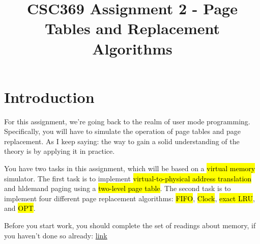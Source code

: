\documentclass[12pt]{article}
\begin{document}
\title{CSC369 Assignment 2 - Page Tables and Replacement Algorithms}
\maketitle

\bigskip

\section{Introduction}

\bigskip

For this assignment, we're going back to the realm of user mode programming.
Specifically, you will have to simulate the operation of page tables and page
replacement. As I keep saying: the way to gain a solid understanding of the theory
is by applying it in practice.

\bigskip

\noindent You have two tasks in this assignment, which will be based on a \hl{virtual memory}
simulator. The first task is to implement \hl{virtual-to-physical address translation}
and hl{demand paging} using a \hl{two-level page table}. The second task is to implement
four different page replacement algorithms: \hl{FIFO}, \hl{Clock}, \hl{exact LRU}, and \hl{OPT}.

\bigskip

\noindent Before you start work, you should complete the set of readings about memory, if
you haven't done so already: \href{http://pages.cs.wisc.edu/~remzi/OSTEP/vm-paging.pdf}{link}
\end{document}

